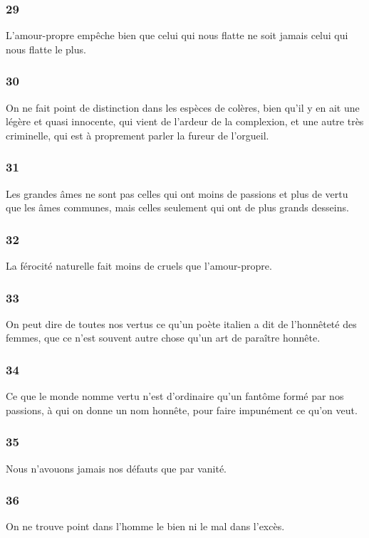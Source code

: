 \documentclass[french,twoside]{book} %
\begin{document}
\subsubsection[{29}]{ \textsc{29} }
\noindent L’amour-propre empêche bien que celui qui nous flatte ne soit jamais celui qui nous flatte le plus.
\subsubsection[{30}]{ \textsc{30} }
\noindent On ne fait point de distinction dans les espèces de colères, bien qu’il y en ait une légère et quasi innocente, qui vient de l’ardeur de la complexion, et une autre très criminelle, qui est à proprement parler la fureur de l’orgueil.
\subsubsection[{31}]{ \textsc{31} }
\noindent Les grandes âmes ne sont pas celles qui ont moins de passions et plus de vertu que les âmes communes, mais celles seulement qui ont de plus grands desseins.
\subsubsection[{32}]{ \textsc{32} }
\noindent La férocité naturelle fait moins de cruels que l’amour-propre.
\subsubsection[{33}]{ \textsc{33} }
\noindent On peut dire de toutes nos vertus ce qu’un poète italien a dit de l’honnêteté des femmes, que ce n’est souvent autre chose qu’un art de paraître honnête.
\subsubsection[{34}]{ \textsc{34} }
\noindent Ce que le monde nomme vertu n’est d’ordinaire qu’un fantôme formé par nos passions, à qui on donne un nom honnête, pour faire impunément ce qu’on veut.
\subsubsection[{35}]{ \textsc{35} }
\noindent Nous n’avouons jamais nos défauts que par vanité.
\subsubsection[{36}]{ \textsc{36} }
\noindent On ne trouve point dans l’homme le bien ni le mal dans l’excès.
\end{document}
